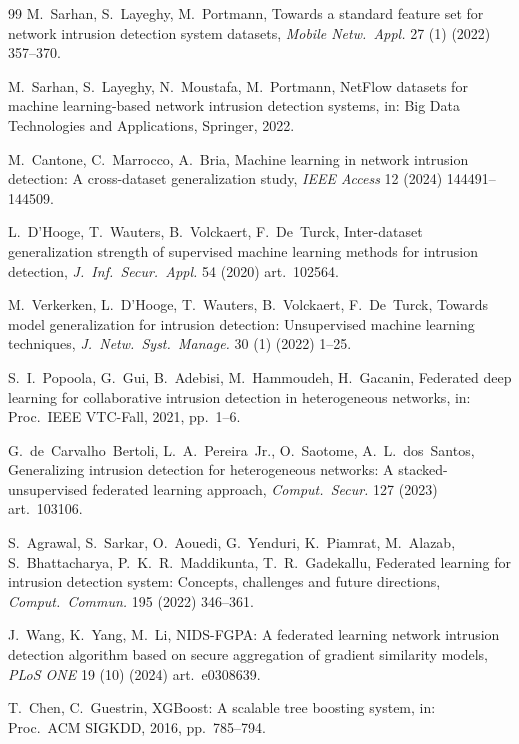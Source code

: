 \documentclass[preprint,12pt,authoryear]{elsarticle}
\begin{document}
\begin{thebibliography}{99}
M.~Sarhan, S.~Layeghy, M.~Portmann, Towards a standard feature set for network
intrusion detection system datasets, \textit{Mobile Netw.\ Appl.} 27 (1) (2022)
357--370.

M.~Sarhan, S.~Layeghy, N.~Moustafa, M.~Portmann, NetFlow datasets for machine
learning-based network intrusion detection systems, in: Big Data Technologies and
Applications, Springer, 2022.

M.~Cantone, C.~Marrocco, A.~Bria, Machine learning in network intrusion detection:
A cross-dataset generalization study, \textit{IEEE Access} 12 (2024)
144491--144509.

L.~D'Hooge, T.~Wauters, B.~Volckaert, F.~De~Turck, Inter-dataset generalization
strength of supervised machine learning methods for intrusion detection,
\textit{J.\ Inf.\ Secur.\ Appl.} 54 (2020) art.~102564.

M.~Verkerken, L.~D'Hooge, T.~Wauters, B.~Volckaert, F.~De~Turck, Towards model
generalization for intrusion detection: Unsupervised machine learning techniques,
\textit{J.\ Netw.\ Syst.\ Manage.} 30 (1) (2022) 1--25.

S.~I.~Popoola, G.~Gui, B.~Adebisi, M.~Hammoudeh, H.~Gacanin, Federated deep
learning for collaborative intrusion detection in heterogeneous networks, in:
Proc.\ IEEE VTC-Fall, 2021, pp.~1--6.

G.~de~Carvalho~Bertoli, L.~A.~Pereira~Jr., O.~Saotome, A.~L.~dos~Santos,
Generalizing intrusion detection for heterogeneous networks: A stacked-unsupervised
federated learning approach, \textit{Comput.\ Secur.} 127 (2023) art.~103106.

S.~Agrawal, S.~Sarkar, O.~Aouedi, G.~Yenduri, K.~Piamrat, M.~Alazab,
S.~Bhattacharya, P.~K.~R.~Maddikunta, T.~R.~Gadekallu, Federated learning for
intrusion detection system: Concepts, challenges and future directions,
\textit{Comput.\ Commun.} 195 (2022) 346--361.

J.~Wang, K.~Yang, M.~Li, NIDS-FGPA: A federated learning network intrusion
detection algorithm based on secure aggregation of gradient similarity models,
\textit{PLoS ONE} 19 (10) (2024) art.~e0308639.

T.~Chen, C.~Guestrin, XGBoost: A scalable tree boosting system, in: Proc.\ ACM
SIGKDD, 2016, pp.~785--794.


\end{thebibliography}
\end{document}
